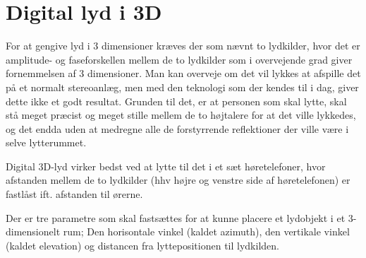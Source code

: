 \section{Digital lyd i 3D}
\label{sec:3DBasics}

For at gengive lyd i 3 dimensioner kræves der som nævnt to lydkilder, hvor det er amplitude- og faseforskellen mellem de to lydkilder som i overvejende grad giver fornemmelsen af 3 dimensioner. Man kan overveje om det vil lykkes at afspille det på et normalt stereoanlæg, men med den teknologi som der kendes til i dag, giver dette ikke et godt resultat. Grunden til det, er at personen som skal lytte, skal stå meget præcist og meget stille mellem de to højtalere for at det ville lykkedes, og det endda uden at medregne alle de forstyrrende reflektioner der ville være i selve lytterummet.

Digital 3D-lyd virker bedst ved at lytte til det i et sæt høretelefoner, hvor afstanden mellem de to lydkilder (hhv højre og venstre side af høretelefonen) er fastlåst ift. afstanden til ørerne. 

Der er tre parametre som skal fastsættes for at kunne placere et lydobjekt i et 3-dimensionelt rum; Den horisontale vinkel (kaldet azimuth), den vertikale vinkel (kaldet elevation) og distancen fra lyttepositionen til lydkilden. 



